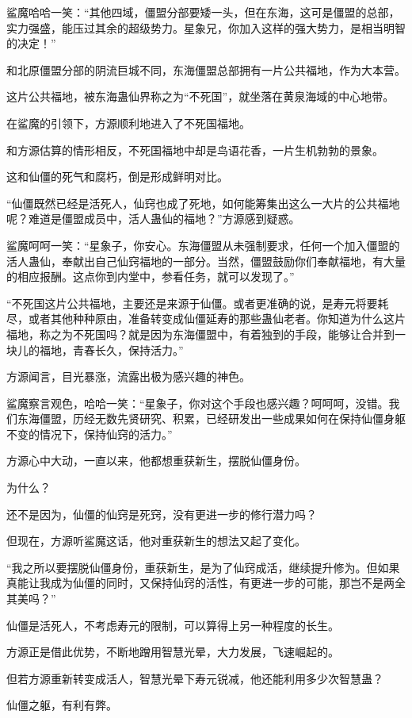 \begin{this_body}
鲨魔哈哈一笑：“其他四域，僵盟分部要矮一头，但在东海，这可是僵盟的总部，实力强盛，能压过其余的超级势力。星象兄，你加入这样的强大势力，是相当明智的决定！”

和北原僵盟分部的阴流巨城不同，东海僵盟总部拥有一片公共福地，作为大本营。

这片公共福地，被东海蛊仙界称之为“不死国”，就坐落在黄泉海域的中心地带。

在鲨魔的引领下，方源顺利地进入了不死国福地。

和方源估算的情形相反，不死国福地中却是鸟语花香，一片生机勃勃的景象。

这和仙僵的死气和腐朽，倒是形成鲜明对比。

“仙僵既然已经是活死人，仙窍也成了死地，如何能筹集出这么一大片的公共福地呢？难道是僵盟成员中，活人蛊仙的福地？”方源感到疑惑。

鲨魔呵呵一笑：“星象子，你安心。东海僵盟从未强制要求，任何一个加入僵盟的活人蛊仙，奉献出自己仙窍福地的一部分。当然，僵盟鼓励你们奉献福地，有大量的相应报酬。这点你到内堂中，参看任务，就可以发现了。”

“不死国这片公共福地，主要还是来源于仙僵。或者更准确的说，是寿元将要耗尽，或者其他种种原由，准备转变成仙僵延寿的那些蛊仙老者。你知道为什么这片福地，称之为不死国吗？就是因为东海僵盟中，有着独到的手段，能够让合并到一块儿的福地，青春长久，保持活力。”

方源闻言，目光暴涨，流露出极为感兴趣的神色。

鲨魔察言观色，哈哈一笑：“星象子，你对这个手段也感兴趣？呵呵呵，没错。我们东海僵盟，历经无数先贤研究、积累，已经研发出一些成果如何在保持仙僵身躯不变的情况下，保持仙窍的活力。”

方源心中大动，一直以来，他都想重获新生，摆脱仙僵身份。

为什么？

还不是因为，仙僵的仙窍是死窍，没有更进一步的修行潜力吗？

但现在，方源听鲨魔这话，他对重获新生的想法又起了变化。

“我之所以要摆脱仙僵身份，重获新生，是为了仙窍成活，继续提升修为。但如果真能让我成为仙僵的同时，又保持仙窍的活性，有更进一步的可能，那岂不是两全其美吗？”

仙僵是活死人，不考虑寿元的限制，可以算得上另一种程度的长生。

方源正是借此优势，不断地蹭用智慧光晕，大力发展，飞速崛起的。

但若方源重新转变成活人，智慧光晕下寿元锐减，他还能利用多少次智慧蛊？

仙僵之躯，有利有弊。


\end{this_body}
